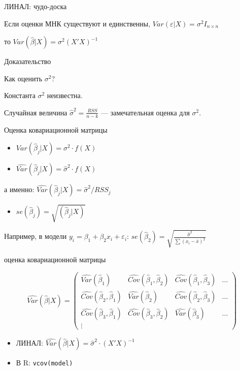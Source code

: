 \documentclass[ignorenonframetext,]{beamer}
\begin{document}
\begin{frame}{ЛИНАЛ: чудо-доска}

Если оценки МНК существуют и единственны,
$Var(\varepsilon|X)=\sigma^2 I_{n\times n}$

то $Var(\hat{\beta}|X)=\sigma^2 (X'X)^{-1}$

Доказательство

\end{frame}

\begin{frame}{Как оценить $\sigma^2$?}

Константа $\sigma^2$ неизвестна.

Случайная величина $\hat{\sigma}^2=\frac{RSS}{n-k}$ --- замечательная
оценка для $\sigma^2$.

\end{frame}

\begin{frame}{Оценка ковариационной матрицы}

\begin{itemize}
\item
  $Var(\hat{\beta}_j | X)=\sigma^2 \cdot f(X)$
\item
  $\widehat{Var}(\hat{\beta}_j | X)=\hat{\sigma}^2 \cdot f(X)$
\end{itemize}

а именно: $\widehat{Var}(\hat{\beta}_j| X)=\hat{\sigma}^2/RSS_j$

\begin{itemize}
\itemsep1pt\parskip0pt
\item
  $se(\hat{\beta}_j)=\sqrt{(\hat{\beta}_j | X)}$
\end{itemize}

Например, в модели $y_i=\beta_1 + \beta_2 x_i + \varepsilon_i$:
$se(\hat{\beta}_2)=\sqrt{\frac{\hat{\sigma}^2}{\sum (x_i-\bar{x})^2}}$

\end{frame}

\begin{frame}{оценка ковариационной матрицы}

\[
\widehat{Var}(\hat{\beta}|X)=\begin{pmatrix}
\widehat{Var}(\hat{\beta}_1) & \widehat{Cov}(\hat{\beta}_1,\hat{\beta}_2) & \widehat{Cov}(\hat{\beta}_1,\hat{\beta}_3) & \ldots \\
\widehat{Cov}(\hat{\beta}_2,\hat{\beta}_1) & \widehat{Var}(\hat{\beta}_2) &  \widehat{Cov}(\hat{\beta}_2,\hat{\beta}_3) & \ldots \\
\widehat{Cov}(\hat{\beta}_3,\hat{\beta}_1) & \widehat{Cov}(\hat{\beta}_3,\hat{\beta}_2) & \widehat{Var}(\hat{\beta}_3) &   \ldots \\
\vdots & & 
\end{pmatrix}
\]

\begin{itemize}
\item
  ЛИНАЛ:
  $\widehat{Var}(\hat{\beta} | X)=\hat{\sigma}^2 \cdot (X'X)^{-1}$
\item
  В R: \texttt{vcov(model)}
\end{itemize}

\end{frame}
\end{document}
